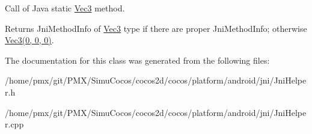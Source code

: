Call of Java static \hyperlink{classVec3}{Vec3} method. 

\begin{DoxyReturn}{Returns}
Jni\+Method\+Info of \hyperlink{classVec3}{Vec3} type if there are proper Jni\+Method\+Info; otherwise \hyperlink{classVec3}{Vec3(0, 0, 0)}. 
\end{DoxyReturn}


The documentation for this class was generated from the following files\+:\begin{DoxyCompactItemize}
\item 
/home/pmx/git/\+P\+M\+X/\+Simu\+Cocos/cocos2d/cocos/platform/android/jni/Jni\+Helper.\+h\item 
/home/pmx/git/\+P\+M\+X/\+Simu\+Cocos/cocos2d/cocos/platform/android/jni/Jni\+Helper.\+cpp\end{DoxyCompactItemize}
